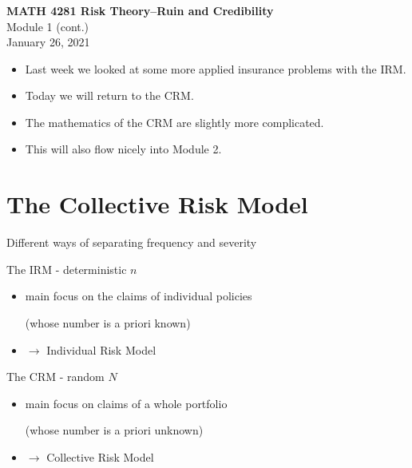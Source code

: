\documentclass[11pt]{beamer}
\begin{document}
\begin{frame}
  \frametitle{}
  \begin{center}
    \textbf{\large MATH 4281 Risk Theory--Ruin and Credibility}\\
    \vspace{1cm}
    {\large  Module 1 (cont.)} \\
    \vspace{1cm}
    {\large  January 26, 2021}
    \end{center}
    \vspace{1cm}
\end{frame}
\begin{frame}{}

\begin{itemize}

\item Last week we looked at some more applied insurance problems with the IRM.

\vfill

\item Today we will return to the CRM.

\vfill 

\item The mathematics of the CRM are slightly more complicated. 

\vfill

\item This will also flow nicely into Module 2.

\end{itemize}

\end{frame}
\section{The Collective Risk Model }
\begin{frame}{Different ways of separating frequency and severity}


The IRM - deterministic $n$
\begin{itemize}
\item main focus on the claims of \alert{individual policies}

 (whose number is a priori known)
\item $\longrightarrow$ \alert{Individual} Risk Model
\end{itemize}

\vfill

The CRM - random $N$
\begin{itemize}
\item main focus on claims of a \alert{whole portfolio}

 (whose number is a priori unknown)
\item $\longrightarrow$ \alert{Collective} Risk Model
\end{itemize}

\end{frame}
\end{document}
